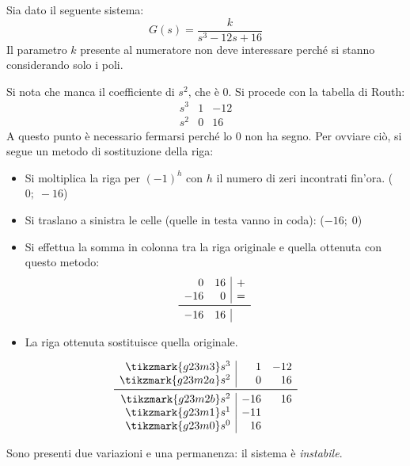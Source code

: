 \begin{esempio} Sia dato il seguente sistema:
\[
	G(s) = \frac{k}{s^3 - 12s +16}
\]
Il parametro \(k\) presente al numeratore non deve interessare perché si stanno
considerando solo i poli.

Si nota che manca il coefficiente di \(s^2\), che è \(0\).
Si procede con la tabella di Routh:
\[\begin{array}{r|rr}
	s^3 & 1 & -12 \\
	s^2 & 0 & 16
\end{array}\]
A questo punto è necessario fermarsi perché lo \(0\) non ha segno. Per ovviare ciò,
si segue un metodo di sostituzione della riga:
\begin{itemize}
	\item Si moltiplica la riga per \((-1)^h\) con \(h\) il numero di zeri
		incontrati fin'ora. (\(0;\; -16\))
	\item Si traslano a sinistra le celle (quelle in testa vanno in coda): (\(-16;\; 0\))
	\item Si effettua la somma in colonna tra la riga originale e quella
		ottenuta con questo metodo:
		\[\begin{array}{rr|r}
			  0 & 16 & +\\
			-16 &  0 & =\\
			\midrule
			-16 & 16
		\end{array}\]
	\item La riga ottenuta sostituisce quella originale.
\end{itemize}
\[\begin{array}{r|rr}
	\tikzmark{g23m3} s^3 &   1 & -12 \\
	\tikzmark{g23m2a}s^2 &   0 &  16 \\
	\midrule
	\tikzmark{g23m2b}s^2 & -16 &  16 \\
	\tikzmark{g23m1} s^1 & -11 	  \\
	\tikzmark{g23m0} s^0 &  16
\end{array}\]
Sono presenti due variazioni e una permanenza: il sistema è \emph{instabile}.
\end{esempio}

